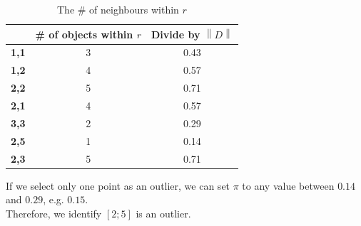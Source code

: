\documentclass[aspectratio=169, 10pt]{beamer}
\newcommand{\norm}[1]{\left\lVert#1\right\rVert}
\begin{document}
\begin{frame}[t]
\begin{columns}[t]
\begin{column}{0.5\textwidth}
            \begin{table}[]
                \scriptsize
                \begin{tabular}{c|c|c}
                             &  \textbf{\# of objects within $r$} & \textbf{Divide by $\norm{D}$}\\ \hline
                \textbf{1,1} &  3 & 0.43 \\
                \textbf{1,2} &  4 & 0.57 \\
                \textbf{2,2} &  5 & 0.71 \\
                \textbf{2,1} &  4 & 0.57 \\
                \textbf{3,3} &  2 & 0.29 \\
                \rowcolor[HTML]{34CDF9}\textbf{2,5} &  1 & 0.14 \\
                \textbf{2,3} &  5 & 0.71   
                \end{tabular}
                \caption{The \# of neighbours within $r$}
            \end{table}

            If we select only one point as an outlier, we can set $\pi$ to any value between $0.14$ and $0.29$, e.g. $0.15$.\\
            Therefore, we identify $[2;5]$ is an outlier.\\            
        \end{column}
    \end{columns}
\end{frame}
\end{document}
